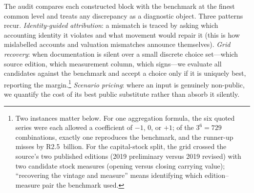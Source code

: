 The audit compares each constructed block with the benchmark at the finest
common level and treats any discrepancy as a diagnostic object. Three
patterns recur. \emph{Identity-guided attribution}: a mismatch is traced by
asking which accounting identity it violates and what movement would repair
it (this is how mislabelled accounts and valuation mismatches announce
themselves). \emph{Grid recovery}: when documentation is silent over a
small discrete choice set---which source edition, which measurement column,
which signs---we evaluate all candidates against the benchmark and accept a
choice only if it is uniquely best, reporting the
margin.\footnote{Two instances matter below. For one aggregation formula,
the six quoted series were each allowed a coefficient of $-1$, $0$, or
$+1$; of the $3^6 = 729$ combinations, exactly one reproduces the
benchmark, and the runner-up misses by R2.5~billion. For the capital-stock
split, the grid crossed the source's two published editions (2019
preliminary versus 2019 revised) with two candidate stock measures
(opening versus closing carrying value); ``recovering the vintage and
measure'' means identifying which edition--measure pair the benchmark
used.} \emph{Scenario pricing}: where an input is genuinely non-public, we
quantify the cost of its best public substitute rather than absorb it
silently.
